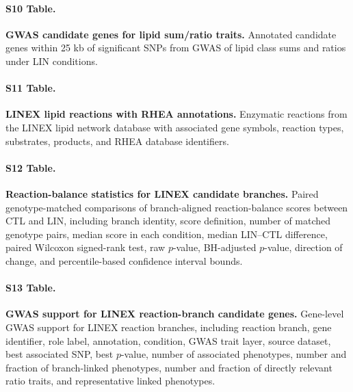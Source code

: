 \documentclass[9pt,twocolumn,twoside]{rilabRxiv}
\begin{document}
\paragraph*{S10 Table.}
\makeatletter
\def\@currentlabelname{S10 Table} 
\makeatother
\label{S10_Table}                                                                                   
\textbf{GWAS candidate genes for lipid sum/ratio traits.} Annotated candidate genes within 25 kb of significant SNPs from GWAS of lipid class sums and ratios under LIN conditions.              
                       
\paragraph*{S11 Table.}       
\makeatletter
\def\@currentlabelname{S11 Table} 
\makeatother
\label{S11_Table}                                                                                  
\textbf{LINEX lipid reactions with RHEA annotations.} Enzymatic reactions from the LINEX lipid network database with associated gene symbols, reaction types, substrates, products, and RHEA database identifiers.

\paragraph*{S12 Table.}
\makeatletter
\def\@currentlabelname{S12 Table}
\makeatother
\label{S12_Table}
\textbf{Reaction-balance statistics for LINEX candidate branches.} Paired genotype-matched comparisons of branch-aligned reaction-balance scores between CTL and LIN, including branch identity, score definition, number of matched genotype pairs, median score in each condition, median LIN--CTL difference, paired Wilcoxon signed-rank test, raw $p$-value, BH-adjusted $p$-value, direction of change, and percentile-based confidence interval bounds.

\paragraph*{S13 Table.}
\makeatletter
\def\@currentlabelname{S13 Table}
\makeatother
\label{S13_Table}
\textbf{GWAS support for LINEX reaction-branch candidate genes.} Gene-level GWAS support for LINEX reaction branches, including reaction branch, gene identifier, role label, annotation, condition, GWAS trait layer, source dataset, best associated SNP, best $p$-value, number of associated phenotypes, number and fraction of branch-linked phenotypes, number and fraction of directly relevant ratio traits, and representative linked phenotypes.
\end{document}
